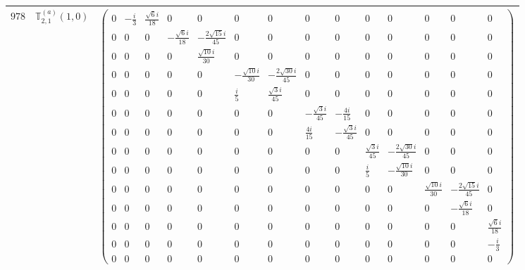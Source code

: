 \documentclass[fleqn,8pt,landscape]{jsarticle}
\begin{document}
\begin{center}
\begin{longtable}{ccc}
$ 978 $ & $ \mathbb{T}_{2,1}^{(a)}(1,0) $ & $ \begin{pmatrix} 0 & - \frac{i}{3} & \frac{\sqrt{6} i}{18} & 0 & 0 & 0 & 0 & 0 & 0 & 0 & 0 & 0 & 0 & 0 \\ 0 & 0 & 0 & - \frac{\sqrt{6} i}{18} & - \frac{2 \sqrt{15} i}{45} & 0 & 0 & 0 & 0 & 0 & 0 & 0 & 0 & 0 \\ 0 & 0 & 0 & 0 & \frac{\sqrt{10} i}{30} & 0 & 0 & 0 & 0 & 0 & 0 & 0 & 0 & 0 \\ 0 & 0 & 0 & 0 & 0 & - \frac{\sqrt{10} i}{30} & - \frac{2 \sqrt{30} i}{45} & 0 & 0 & 0 & 0 & 0 & 0 & 0 \\ 0 & 0 & 0 & 0 & 0 & \frac{i}{5} & \frac{\sqrt{3} i}{45} & 0 & 0 & 0 & 0 & 0 & 0 & 0 \\ 0 & 0 & 0 & 0 & 0 & 0 & 0 & - \frac{\sqrt{3} i}{45} & - \frac{4 i}{15} & 0 & 0 & 0 & 0 & 0 \\ 0 & 0 & 0 & 0 & 0 & 0 & 0 & \frac{4 i}{15} & - \frac{\sqrt{3} i}{45} & 0 & 0 & 0 & 0 & 0 \\ 0 & 0 & 0 & 0 & 0 & 0 & 0 & 0 & 0 & \frac{\sqrt{3} i}{45} & - \frac{2 \sqrt{30} i}{45} & 0 & 0 & 0 \\ 0 & 0 & 0 & 0 & 0 & 0 & 0 & 0 & 0 & \frac{i}{5} & - \frac{\sqrt{10} i}{30} & 0 & 0 & 0 \\ 0 & 0 & 0 & 0 & 0 & 0 & 0 & 0 & 0 & 0 & 0 & \frac{\sqrt{10} i}{30} & - \frac{2 \sqrt{15} i}{45} & 0 \\ 0 & 0 & 0 & 0 & 0 & 0 & 0 & 0 & 0 & 0 & 0 & 0 & - \frac{\sqrt{6} i}{18} & 0 \\ 0 & 0 & 0 & 0 & 0 & 0 & 0 & 0 & 0 & 0 & 0 & 0 & 0 & \frac{\sqrt{6} i}{18} \\ 0 & 0 & 0 & 0 & 0 & 0 & 0 & 0 & 0 & 0 & 0 & 0 & 0 & - \frac{i}{3} \\ 0 & 0 & 0 & 0 & 0 & 0 & 0 & 0 & 0 & 0 & 0 & 0 & 0 & 0 \end{pmatrix} $ \\ \hline

\end{longtable}
\end{center}
\end{document}
